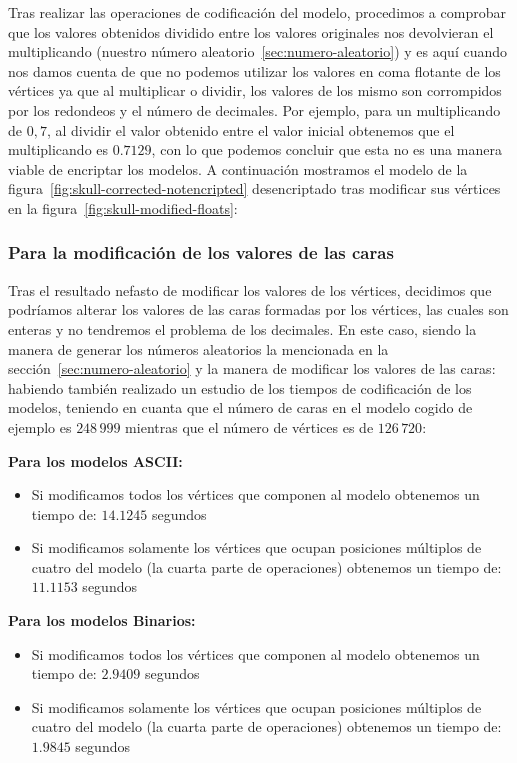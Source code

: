 Tras realizar las operaciones de codificación del modelo, procedimos a comprobar que los valores obtenidos dividido entre los valores originales nos devolvieran el multiplicando (nuestro número aleatorio~\ref{sec:numero-aleatorio}) y es aquí cuando nos damos cuenta de que no podemos utilizar los valores en coma flotante de los vértices ya que al multiplicar o dividir, los valores de los mismo son corrompidos por los redondeos y el número de decimales. Por ejemplo, para un multiplicando de $0,7$, al dividir el valor obtenido entre el valor inicial obtenemos que el multiplicando es $0.7129$, con lo que podemos concluir que esta no es una manera viable de encriptar los modelos. A continuación mostramos el modelo de la figura~\ref{fig:skull-corrected-notencripted} desencriptado tras modificar sus vértices en la figura~\ref{fig:skull-modified-floats}:

\subsubsection{Para la modificación de los valores de las caras}
Tras el resultado nefasto de modificar los valores de los vértices, decidimos que podríamos alterar los valores de las caras formadas por los vértices, las cuales son enteras y no tendremos el problema de los decimales. En este caso, siendo la manera de generar los números aleatorios la mencionada en la sección~\ref{sec:numero-aleatorio} y la manera de modificar los valores de las caras:  habiendo también realizado un estudio de los tiempos de codificación de los modelos, teniendo en cuanta que el número de caras en el modelo cogido de ejemplo es $248\,999$ mientras que el número de vértices es de $126\,720$:

\textbf{Para los modelos ASCII:}
\begin{itemize}
	\item Si modificamos todos los vértices que componen al modelo obtenemos un tiempo de: $14.1245$ segundos
	\item Si modificamos solamente los vértices que ocupan posiciones múltiplos de cuatro del modelo (la cuarta parte de operaciones) obtenemos un tiempo de: $11.1153$ segundos
\end{itemize}

\textbf{Para los modelos Binarios:}
\begin{itemize}
	\item Si modificamos todos los vértices que componen al modelo obtenemos un tiempo de: $2.9409$ segundos
	\item Si modificamos solamente los vértices que ocupan posiciones múltiplos de cuatro del modelo (la cuarta parte de operaciones) obtenemos un tiempo de: $1.9845$ segundos
\end{itemize}

